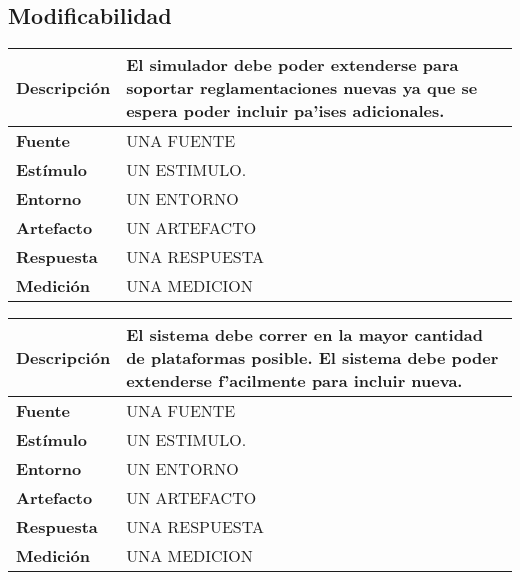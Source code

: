 \subsection{Modificabilidad}

\begin{center}
  \begin{tabular}{| l | p{10cm} | }
    \hline
  \textbf{Descripción} & El simulador debe poder extenderse para soportar reglamentaciones nuevas ya que se espera poder incluir pa'ises adicionales.\\  \hline
  \textbf{Fuente} & UNA FUENTE\\  \hline
  \textbf{Estímulo} & UN ESTIMULO.\\  \hline
  \textbf{Entorno} & UN ENTORNO\\  \hline
  \textbf{Artefacto} & UN ARTEFACTO\\  \hline
  \textbf{Respuesta} & UNA RESPUESTA\\  \hline
  \textbf{Medición} & UNA MEDICION\\  \hline
  \end{tabular}
\end{center} 

\begin{center}
  \begin{tabular}{| l | p{10cm} | }
    \hline
  \textbf{Descripción} & El sistema debe correr en la mayor cantidad de plataformas posible. El sistema debe poder extenderse f'acilmente para incluir nueva.\\  \hline
  \textbf{Fuente} & UNA FUENTE\\  \hline
  \textbf{Estímulo} & UN ESTIMULO.\\  \hline
  \textbf{Entorno} & UN ENTORNO\\  \hline
  \textbf{Artefacto} & UN ARTEFACTO\\  \hline
  \textbf{Respuesta} & UNA RESPUESTA\\  \hline
  \textbf{Medición} & UNA MEDICION\\  \hline
  \end{tabular}
\end{center} 

